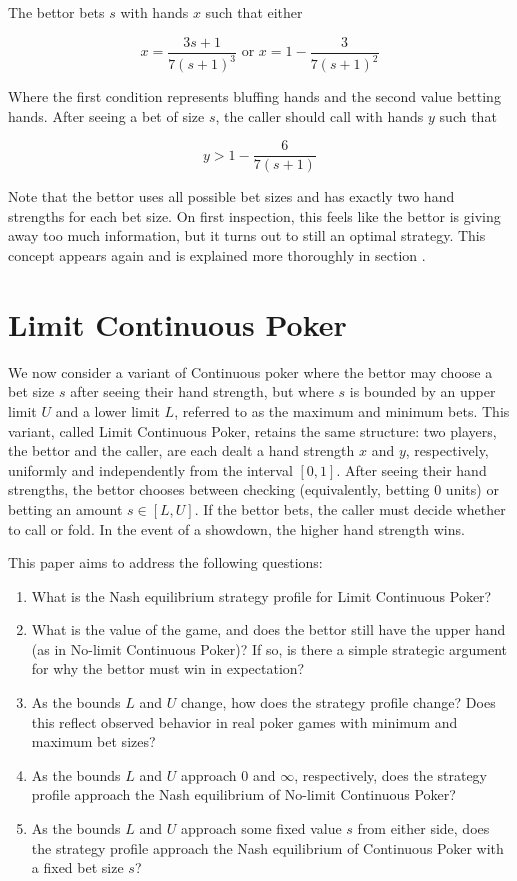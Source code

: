 \documentclass[a4paper,12pt]{article}
\theoremstyle{plain}
\theoremstyle{definition}
\begin{document}
The bettor bets $s$ with hands $x$ such that either

$$ x = \frac{3 s+1}{7 (s+1)^3} \text{ or } x = 1 - \frac{3}{7 (s+1)^2} $$

Where the first condition represents bluffing hands and the second value betting hands. After seeing a bet of size $s$, the caller should call with hands $y$ such that

$$ y > 1 - \frac{6}{7 (s+1)} $$

Note that the bettor uses all possible bet sizes and has exactly two hand strengths for each bet size. On first inspection, this feels like the bettor is giving away too much information, but it turns out to still an optimal strategy. This concept appears again and is explained more thoroughly in section .

\section{Limit Continuous Poker}
We now consider a variant of Continuous poker where the bettor may choose a bet size $s$ after seeing their hand strength, but where $s$ is bounded by an upper limit $U$ and a lower limit $L$, referred to as the maximum and minimum bets. This variant, called Limit Continuous Poker, retains the same structure: two players, the bettor and the caller, are each dealt a hand strength $x$ and $y$, respectively, uniformly and independently from the interval $[0, 1]$. After seeing their hand strengths, the bettor chooses between checking (equivalently, betting $0$ units) or betting an amount $s \in [L, U]$. If the bettor bets, the caller must decide whether to call or fold. In the event of a showdown, the higher hand strength wins.

This paper aims to address the following questions:
\begin{enumerate}
    \item What is the Nash equilibrium strategy profile for Limit Continuous Poker?
    \item What is the value of the game, and does the bettor still have the upper hand (as in No-limit Continuous Poker)? If so, is there a simple strategic argument for why the bettor must win in expectation?
    \item As the bounds $L$ and $U$ change, how does the strategy profile change? Does this reflect observed behavior in real poker games with minimum and maximum bet sizes?
    \item As the bounds $L$ and $U$ approach $0$ and $\infty$, respectively, does the strategy profile approach the Nash equilibrium of No-limit Continuous Poker?
    \item As the bounds $L$ and $U$ approach some fixed value $s$ from either side, does the strategy profile approach the Nash equilibrium of Continuous Poker with a fixed bet size $s$?
\end{enumerate}
\end{document}
